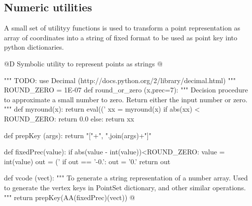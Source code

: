 \documentclass[11pt,oneside]{article}	%
\begin{document}
\subsection{Numeric utilities}

A small set of utilityy functions is used to transform a point representation as array of coordinates into a string of fixed format to be used as point key into python dictionaries.

@D Symbolic utility to represent points as strings
@{""" TODO: 
use Decimal (http://docs.python.org/2/library/decimal.html) 
"""
ROUND_ZERO = 1E-07
def round_or_zero (x,prec=7):
	"""
	Decision procedure to approximate a small number to zero.
	Return either the input number or zero.
	"""
	def myround(x):
		return eval(('%
	xx = myround(x)
	if abs(xx) < ROUND_ZERO: return 0.0
	else: return xx

def prepKey (args): return "["+", ".join(args)+"]"

def fixedPrec(value):
	if abs(value - int(value))<ROUND_ZERO: value = int(value)
	out = ('%
	if out == '-0.': out = '0.'
	return out
	
def vcode (vect): 
	"""
	To generate a string representation of a number array.
	Used to generate the vertex keys in PointSet dictionary, and other 
	similar operations.
	"""
	return prepKey(AA(fixedPrec)(vect))
@}




\end{document}
